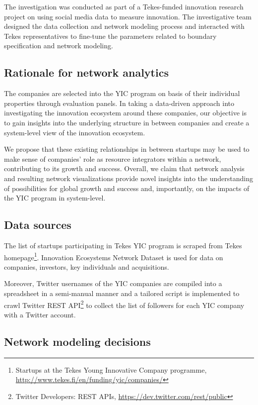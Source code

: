 The investigation was conducted as part of a Tekes-funded innovation research project on using social media data to measure innovation. The investigative team designed the data collection and network modeling process and interacted with Tekes representatives to fine-tune the parameters related to boundary specification and network modeling.

\subsection{Rationale for network analytics}

The companies are selected into the YIC program on basis of their individual properties through evaluation panels. In taking a data-driven approach into investigating the innovation ecosystem around these companies, our objective is to gain insights into the underlying structure in between companies and create a system-level view of the innovation ecosystem. 

We propose that these existing relationships in between startups may be used to make sense of companies' role as resource integrators within a network, contributing to its growth and success. Overall, we claim that network analysis and resulting network visualizations provide novel insights into the understanding of possibilities for global growth and success and, importantly, on the impacts of the YIC program in system-level.

\subsection{Data sources}

The list of startups participating in Tekes YIC program is scraped from Tekes homepage\footnote{Startups at the Tekes Young Innovative Company programme, \url{http://www.tekes.fi/en/funding/yic/companies/}}. Innovation Ecosystems Network Dataset \citep{Rubens2010LeveragingMoves} is used for data on  companies, investors, key individuals and acquisitions. 

Moreover, Twitter usernames of the YIC companies are compiled into a spreadsheet in a semi-manual manner and a tailored script is implemented to crawl Twitter REST API\footnote{Twitter Developers: REST APIs, \url{https://dev.twitter.com/rest/public}} to collect the list of followers for each YIC company with a Twitter account.

\subsection{Network modeling decisions}

